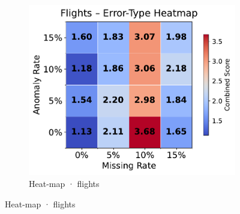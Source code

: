 \documentclass[10pt]{article} %
\numberwithin{equation}{section}
\begin{document}
\begin{figure}[htbp]
\begin{subfigure}{0.295\linewidth}
    \includegraphics[width=\linewidth]{figures/5.3.2graph/flights_heatmap.pdf}
    \caption{Heat-map · flights}
  \end{subfigure}


\end{figure}
\end{document}
